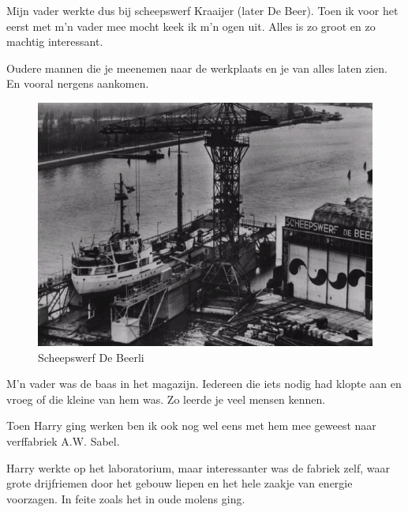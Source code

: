 \documentclass[12pt,twoside, openright]{memoir}
\begin{document}
Mijn vader werkte dus bij scheepswerf Kraaijer (later De Beer). Toen ik voor het eerst met m’n vader mee mocht keek ik m’n ogen uit. Alles is zo groot en zo machtig interessant.

Oudere mannen die je meenemen naar de werkplaats en je van alles laten zien. En vooral nergens aankomen. 

\begin{figure}
\includegraphics[width=\textwidth]{img/ch32/DeBeer}
\caption*{\footnotesize Scheepswerf De Beerli}
\end{figure}

M’n vader was de baas in het magazijn. Iedereen die iets nodig had klopte aan en vroeg of die kleine van hem was. Zo leerde je veel mensen kennen. 




Toen Harry ging werken ben ik ook nog wel eens met hem mee geweest naar verffabriek A.W. Sabel. 

Harry werkte op het laboratorium, maar interessanter was de fabriek zelf, waar grote drijfriemen door het gebouw liepen en het hele zaakje van energie voorzagen. In feite zoals het in oude molens ging.
\end{document}
